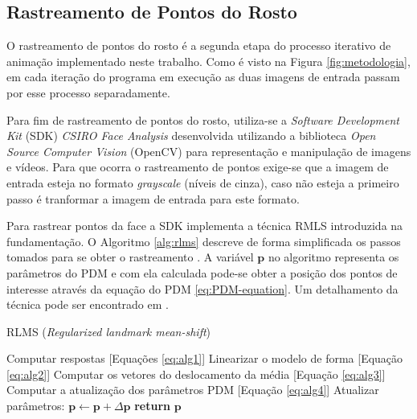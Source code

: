 \subsection{Rastreamento de Pontos do Rosto}

O rastreamento de pontos do rosto é a segunda etapa do processo iterativo de animação implementado neste trabalho. Como é visto na Figura \ref{fig:metodologia}, em cada iteração do programa em execução as duas imagens de entrada passam por esse processo separadamente.

Para fim de rastreamento de pontos do rosto, utiliza-se a  \textit{Software Development Kit} (SDK) \textit{CSIRO Face Analysis} \cite{cox2013csiro} desenvolvida utilizando a biblioteca  \textit{Open Source Computer Vision} (OpenCV) para representação e manipulação de imagens e vídeos. Para que ocorra o rastreamento de pontos exige-se que a imagem de entrada esteja no formato \textit{grayscale} (níveis de cinza), caso não esteja a primeiro passo é tranformar a imagem de entrada para este formato. 

Para rastrear pontos da face a SDK implementa a técnica RMLS introduzida na fundamentação. O Algoritmo \ref{alg:rlms} descreve de forma simplificada os passos tomados para se obter o rastreamento \cite{saragih2011deformable}. A variável $\mathbf{p}$ no algoritmo representa os parâmetros do PDM e com ela calculada pode-se obter a posição dos pontos de interesse através da equação do PDM \ref{eq:PDM-equation}. Um detalhamento da técnica pode ser encontrado em  \cite{saragih2011deformable}.

\begin{algorithm}[!htb]
\caption{RLMS (\textit{Regularized landmark mean-shift})}\label{alg:rlms}
\begin{algorithmic}[1]
 
\State Computar respostas [Equações \ref{eq:alg1}]
   \State Linearizar o modelo de forma [Equação \ref{eq:alg2}]
   \State Computar os vetores do deslocamento da média [Equação \ref{eq:alg3}]
   \State Computar a atualização dos parâmetros PDM [Equação \ref{eq:alg4}]
   \State Atualizar parâmetros: $\textbf{p} \leftarrow \textbf{p} + \Delta\textbf{p}$
   \EndWhile
   \State \textbf{return} $\textbf{p}$
\end{algorithmic}
\end{algorithm}





